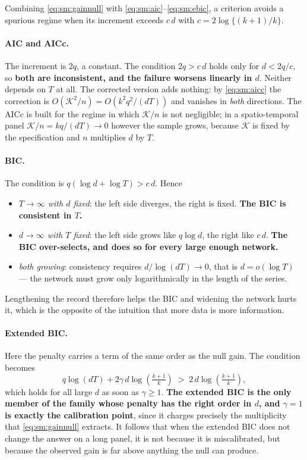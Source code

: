 \documentclass[11pt]{article}
\begin{document}
Combining \eqref{eq:sm:gainnull} with \eqref{eq:sm:aic}--\eqref{eq:sm:ebic}, a criterion avoids a spurious regime when its increment exceeds $c\,d$ with $c = 2\log\{(k+1)/k\}$.

\paragraph{AIC and AICc.} The increment is $2q$, a constant. The condition $2q > c\,d$ holds only for $d < 2q/c$, so \textbf{both are inconsistent, and the failure worsens linearly in $d$}. Neither depends on $T$ at all. The corrected version adds nothing: by \eqref{eq:sm:aicc} the correction is $O(\mathcal{K}^2/n) = O(k^2q^2/(dT))$ and vanishes in \emph{both} directions. The AICc is built for the regime in which $\mathcal{K}/n$ is not negligible; in a spatio-temporal panel $\mathcal{K}/n = kq/(dT) \to 0$ however the sample grows, because $\mathcal{K}$ is fixed by the specification and $n$ multiplies $d$ by $T$.

\paragraph{BIC.} The condition is $q(\log d + \log T) > c\,d$. Hence
\begin{itemize}[leftmargin=1.4em,itemsep=2pt,topsep=3pt]
  \item \emph{$T \to \infty$ with $d$ fixed}: the left side diverges, the right is fixed. \textbf{The BIC is consistent in $T$.}
  \item \emph{$d \to \infty$ with $T$ fixed}: the left side grows like $q\log d$, the right like $c\,d$. \textbf{The BIC over-selects, and does so for every large enough network.}
  \item \emph{both growing}: consistency requires $d / \log(dT) \to 0$, that is $d = o(\log T)$ --- the network must grow only logarithmically in the length of the series.
\end{itemize}
Lengthening the record therefore helps the BIC and widening the network hurts it, which is the opposite of the intuition that more data is more information.

\paragraph{Extended BIC.} Here the penalty carries a term of the same order as the null gain. The condition becomes
\[
  q\log(dT) + 2\gamma\, d \log\!\left(\tfrac{k+1}{k}\right) \;>\; 2\,d\log\!\left(\tfrac{k+1}{k}\right),
\]
which holds for all large $d$ as soon as $\gamma \ge 1$. \textbf{The extended BIC is the only member of the family whose penalty has the right order in $d$, and $\gamma = 1$ is exactly the calibration point}, since it charges precisely the multiplicity that \eqref{eq:sm:gainnull} extracts. It follows that when the extended BIC does not change the answer on a long panel, it is not because it is miscalibrated, but because the observed gain is far above anything the null can produce.
\end{document}
